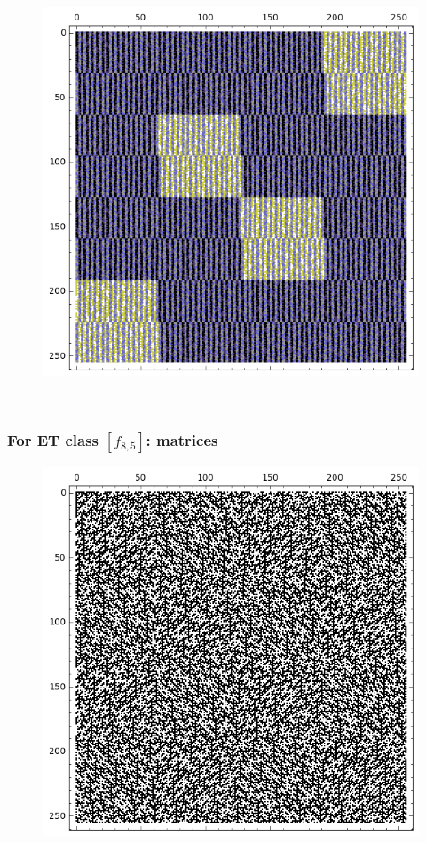 \documentclass[pdf,sprung,slideColor,nocolorBG]{beamer}
\newenvironment{colortheme}[1]{
\def\ProvidesPackageRCS $##1${\relax}
\renewcommand{\ProcessOptions}{\relax}
\makeatletter

\makeatother
}{}
\begin{document}
\begin{colortheme}{jubata}
\begin{frame}
\begin{figure}
\begin{minipage}{.48\textwidth}
  \label{fig:8_4_weight_class_matrix}
\end{minipage}%
\begin{minipage}{.48\textwidth}
  \centering
  \includegraphics[width=.9\linewidth]{../matrix_plot/re8_4_bent_cayley_graph_index_matrix.png}
  \label{fig:8_4_bent_cayley_graph_index_matrix}
\end{minipage}
\end{figure}
~
\end{frame}
\begin{frame}
\frametitle{For ET class $[f_{8,5}]$: matrices}
\begin{figure}
\centering
\begin{minipage}{.48\textwidth}
  \centering
  \includegraphics[width=.9\linewidth]{../matrix_plot/re8_5_weight_class_matrix.png}

\end{minipage}
\end{figure}
\end{frame}
\end{colortheme}
\end{document}
